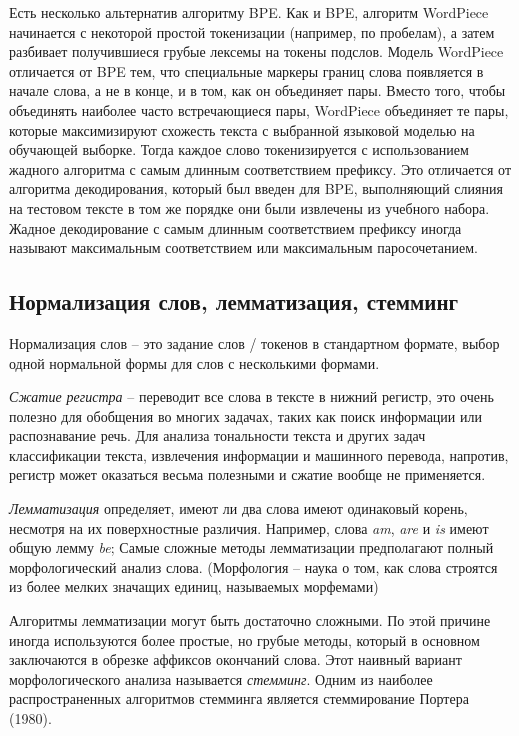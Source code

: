 \documentclass[a4paper,12pt,preview]{report} %
\begin{document}
	Есть несколько альтернатив алгоритму BPE. Как и BPE, алгоритм WordPiece начинается с некоторой простой токенизации (например, по пробелам), а затем разбивает получившиеся грубые лексемы на токены подслов. Модель WordPiece отличается от BPE тем, что специальные маркеры границ слова появляется в начале слова, а не в конце, и в том, как он объединяет пары. Вместо того, чтобы объединять наиболее часто встречающиеся пары, WordPiece объединяет те пары, которые максимизируют схожесть текста с выбранной языковой моделью на обучающей выборке. Тогда каждое слово токенизируется с использованием жадного алгоритма с самым длинным соответствием префиксу. Это отличается от алгоритма декодирования, который был введен для BPE, выполняющий слияния
	на тестовом тексте в том же порядке они были извлечены из учебного набора.
	Жадное декодирование с самым длинным соответствием префиксу иногда называют максимальным соответствием или максимальным паросочетанием.
	
	\subsection{Нормализация слов, лемматизация, стемминг}
	Нормализация слов -- это задание слов / токенов в стандартном формате, выбор одной нормальной формы для слов с несколькими формами.
	
	\textit{Сжатие регистра} -- переводит все слова в тексте в нижний регистр, это очень полезно для обобщения во многих задачах, таких как поиск информации или распознавание речь. Для анализа тональности текста и других задач классификации текста, извлечения информации и машинного перевода, напротив, регистр может оказаться весьма полезными и
	сжатие вообще не применяется.
	
	\textit{Лемматизация} определяет, имеют ли два слова имеют одинаковый корень,	несмотря на их поверхностные различия. Например, слова \textit{am}, \textit{are} и \textit{is} имеют общую лемму \textit{be}; 
	Самые сложные методы лемматизации предполагают полный морфологический анализ слова. (Морфология -- наука о том, как слова строятся из более мелких значащих единиц, называемых морфемами)
	
	
	Алгоритмы лемматизации могут быть достаточно сложными. По этой причине иногда используются более простые, но грубые методы, который в основном заключаются в обрезке аффиксов окончаний слова. Этот наивный вариант морфологического анализа называется \textit{стемминг}. Одним из наиболее распространенных алгоритмов стемминга является стеммирование Портера (1980). \cite{6}\\
	
\end{document}
